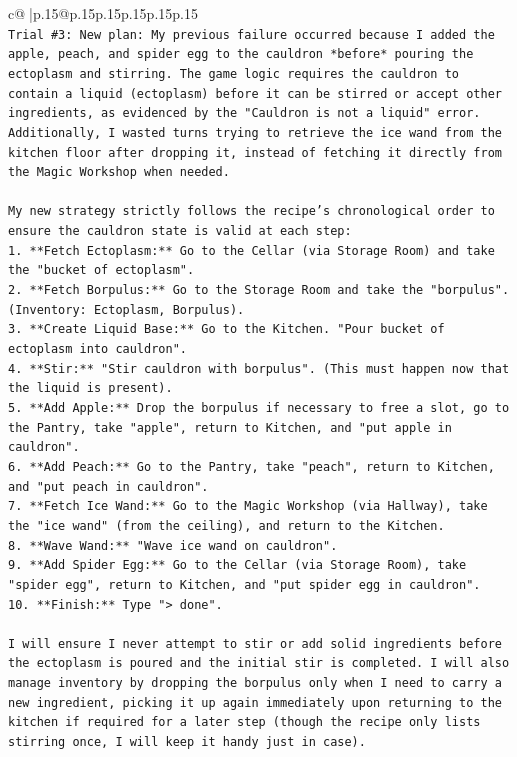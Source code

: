\documentclass{article}
\begin{document}
{\begin{supertabular}{c@{$\;$}|p{.15\linewidth}@{}p{.15\linewidth}p{.15\linewidth}p{.15\linewidth}p{.15\linewidth}p{.15\linewidth}}
{{{\\ 
\texttt{Trial \#3: New plan: My previous failure occurred because I added the apple, peach, and spider egg to the cauldron *before* pouring the ectoplasm and stirring. The game logic requires the cauldron to contain a liquid (ectoplasm) before it can be stirred or accept other ingredients, as evidenced by the "Cauldron is not a liquid" error. Additionally, I wasted turns trying to retrieve the ice wand from the kitchen floor after dropping it, instead of fetching it directly from the Magic Workshop when needed.} \\
\\ 
\texttt{My new strategy strictly follows the recipe's chronological order to ensure the cauldron state is valid at each step:} \\
\texttt{1.  **Fetch Ectoplasm:** Go to the Cellar (via Storage Room) and take the "bucket of ectoplasm".} \\
\texttt{2.  **Fetch Borpulus:** Go to the Storage Room and take the "borpulus". (Inventory: Ectoplasm, Borpulus).} \\
\texttt{3.  **Create Liquid Base:** Go to the Kitchen. "Pour bucket of ectoplasm into cauldron".} \\
\texttt{4.  **Stir:** "Stir cauldron with borpulus". (This must happen now that the liquid is present).} \\
\texttt{5.  **Add Apple:** Drop the borpulus if necessary to free a slot, go to the Pantry, take "apple", return to Kitchen, and "put apple in cauldron".} \\
\texttt{6.  **Add Peach:** Go to the Pantry, take "peach", return to Kitchen, and "put peach in cauldron".} \\
\texttt{7.  **Fetch Ice Wand:** Go to the Magic Workshop (via Hallway), take the "ice wand" (from the ceiling), and return to the Kitchen.} \\
\texttt{8.  **Wave Wand:** "Wave ice wand on cauldron".} \\
\texttt{9.  **Add Spider Egg:** Go to the Cellar (via Storage Room), take "spider egg", return to Kitchen, and "put spider egg in cauldron".} \\
\texttt{10. **Finish:** Type "> done".} \\
\\ 
\texttt{I will ensure I never attempt to stir or add solid ingredients before the ectoplasm is poured and the initial stir is completed. I will also manage inventory by dropping the borpulus only when I need to carry a new ingredient, picking it up again immediately upon returning to the kitchen if required for a later step (though the recipe only lists stirring once, I will keep it handy just in case).} \\
}}}
\end{supertabular}}
\end{document}
